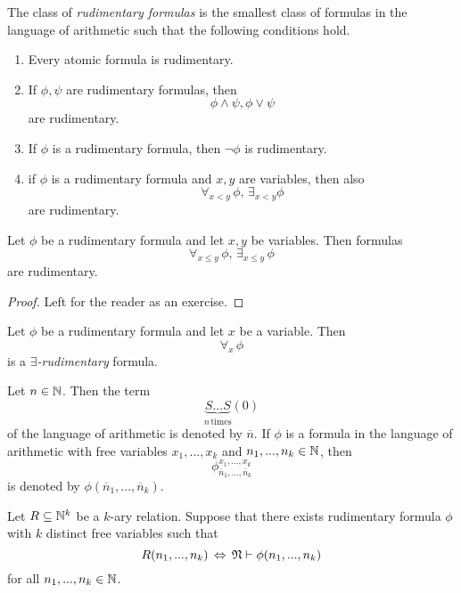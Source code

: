 \documentclass[10pt]{amsart}
\begin{document}
\begin{definition}
	The class of \textit{rudimentary formulas} is the smallest class of formulas in the language of arithmetic such that the following conditions hold.
	\begin{enumerate}[label=\textbf{(\arabic*)}, leftmargin=3.0em]
		\item Every atomic formula is rudimentary.
		\item If $\phi,\psi$ are rudimentary formulas, then
			$$\phi \wedge \psi,\phi \vee \psi$$
			are rudimentary.
		\item If $\phi$ is a rudimentary formula, then $\neg \phi$ is rudimentary.
		\item if $\phi$ is a rudimentary formula and $x,y$ are variables, then also
			$$\forall_{x < y}\,\phi,\,\exists_{x < y}\phi$$
			are rudimentary.
	\end{enumerate}
\end{definition}

\begin{fact}\label{fact:all_bounded_quantifier_are_rudimentary}
	Let $\phi$ be a rudimentary formula and let $x,y$ be variables. Then formulas
	$$\forall_{x \leq y}\,\phi,\,\exists_{x \leq y}\,\phi$$
	are rudimentary.
\end{fact}
\begin{proof}
	Left for the reader as an exercise.
\end{proof}

\begin{definition}
	Let $\phi$ be a rudimentary formula and let $x$ be a variable. Then 
	$$\forall_x\,\phi$$
	is a \textit{$\exists$-rudimentary} formula.
\end{definition}

\begin{remark}
	Let $n \in {\mathbb N}$. Then the term
	$$\underbrace{S...S}_{n\,\mathrm{times}}(0)$$
	of the language of arithmetic is denoted by $\overline{n}$. If $\phi$ is a formula in the language of arithmetic with free variables $x_1,...,x_k$ and $n_1,...,n_k\in {\mathbb N}$, then 
	$$\phi^{x_1,...,x_k}_{\overline{n}_1,...,\overline{n}_k}$$
	is denoted by $\phi(\overline{n}_1,...,\overline{n}_k)$.
\end{remark}

\begin{definition}
	Let $R \subseteq {\mathbb N}^k$ be a $k$-ary relation. Suppose that there exists rudimentary formula $\phi$ with $k$ distinct free variables such that 
	$$R(n_1,...,n_k)\,\Leftrightarrow\,{\mathfrak N}\vdash \phi(n_1,...,n_k)$$
	for all $n_1,...,n_k \in {\mathbb N}$.
\end{definition}
\end{document}
